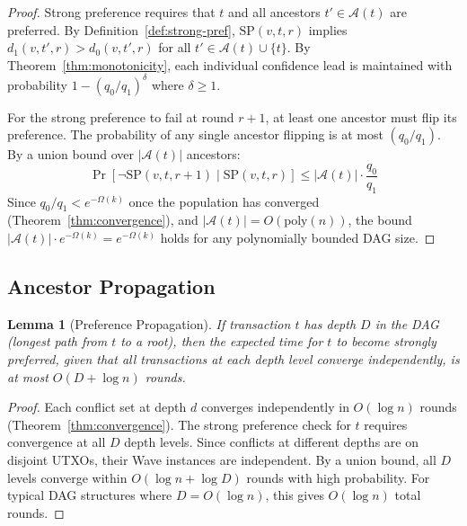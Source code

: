 \documentclass[11pt,a4paper]{article}
\newtheorem{lemma}[theorem]{Lemma}
\begin{document}
\begin{proof}
Strong preference requires that $t$ and all ancestors $t' \in \mathcal{A}(t)$ are preferred.
By Definition~\ref{def:strong-pref}, $\text{SP}(v, t, r)$ implies $d_1(v, t', r) > d_0(v, t', r)$
for all $t' \in \mathcal{A}(t) \cup \{t\}$. By Theorem~\ref{thm:monotonicity}, each individual
confidence lead is maintained with probability $1 - (q_0/q_1)^{\delta}$ where $\delta \geq 1$.

For the strong preference to fail at round $r+1$, at least one ancestor must flip its
preference. The probability of any single ancestor flipping is at most $(q_0/q_1)$.
By a union bound over $|\mathcal{A}(t)|$ ancestors:
\[
\Pr[\lnot \text{SP}(v, t, r+1) \mid \text{SP}(v, t, r)] \leq |\mathcal{A}(t)| \cdot \frac{q_0}{q_1}
\]
Since $q_0/q_1 < e^{-\Omega(k)}$ once the population has converged (Theorem~\ref{thm:convergence}),
and $|\mathcal{A}(t)| = O(\text{poly}(n))$, the bound $|\mathcal{A}(t)| \cdot e^{-\Omega(k)} = e^{-\Omega(k)}$
holds for any polynomially bounded DAG size.
\end{proof}

\subsection{Ancestor Propagation}

\begin{lemma}[Preference Propagation]
\label{lem:propagation}
If transaction $t$ has depth $D$ in the DAG (longest path from $t$ to a root), then the
expected time for $t$ to become strongly preferred, given that all transactions at each
depth level converge independently, is at most $O(D + \log n)$ rounds.
\end{lemma}

\begin{proof}
Each conflict set at depth $d$ converges independently in $O(\log n)$ rounds
(Theorem~\ref{thm:convergence}). The strong preference check for $t$ requires convergence
at all $D$ depth levels. Since conflicts at different depths are on disjoint UTXOs, their
Wave instances are independent. By a union bound, all $D$ levels converge within
$O(\log n + \log D)$ rounds with high probability. For typical DAG structures where
$D = O(\log n)$, this gives $O(\log n)$ total rounds.
\end{proof}

\end{document}
